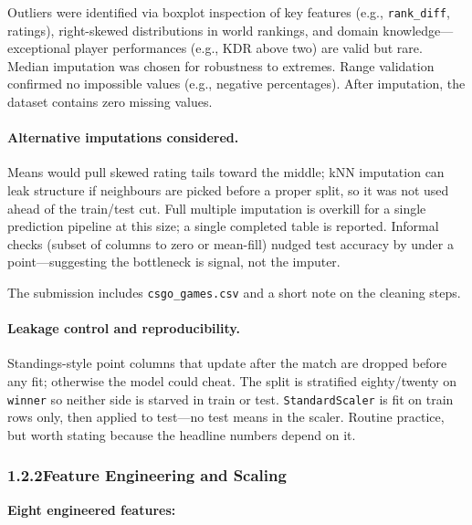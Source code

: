 \documentclass[12pt,a4paper]{article}
\begin{document}
Outliers were identified via boxplot inspection of key features (e.g., \texttt{rank\_diff}, ratings), right-skewed distributions in world rankings, and domain knowledge---exceptional player performances (e.g., KDR above two) are valid but rare. Median imputation was chosen for robustness to extremes. Range validation confirmed no impossible values (e.g., negative percentages). After imputation, the dataset contains zero missing values.

\paragraph{Alternative imputations considered.}
Means would pull skewed rating tails toward the middle; kNN imputation can leak structure if neighbours are picked before a proper split, so it was not used ahead of the train/test cut. Full multiple imputation is overkill for a single prediction pipeline at this size; a single completed table is reported. Informal checks (subset of columns to zero or mean-fill) nudged test accuracy by under a point---suggesting the bottleneck is signal, not the imputer.

The submission includes \texttt{csgo\_games.csv} and a short note on the cleaning steps.

\paragraph{Leakage control and reproducibility.}
Standings-style point columns that update after the match are dropped before any fit; otherwise the model could cheat. The split is stratified eighty/twenty on \texttt{winner} so neither side is starved in train or test. \texttt{StandardScaler} is fit on train rows only, then applied to test---no test means in the scaler. Routine practice, but worth stating because the headline numbers depend on it.

\newpage
\subsubsection{1.2.2\quad Feature Engineering and Scaling}

\textbf{Eight engineered features:}
\end{document}
